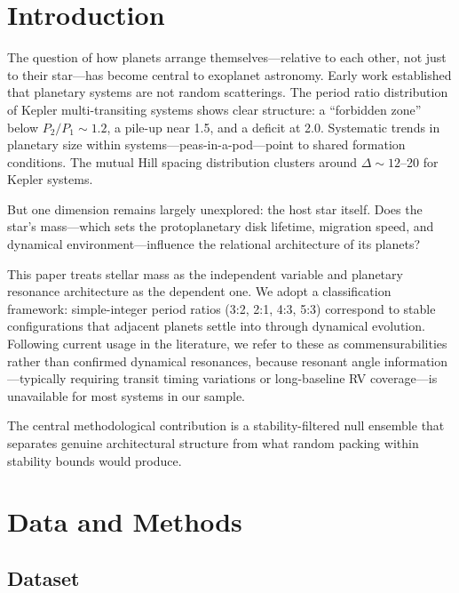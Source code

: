 \documentclass[twocolumn,usenatbib]{mnras}
\begin{document}
\section{Introduction}
\label{sec:intro}

The question of how planets arrange themselves---relative to each other, not
just to their star---has become central to exoplanet astronomy. Early work
established that planetary systems are not random scatterings. The period ratio
distribution of Kepler multi-transiting systems shows clear structure: a
``forbidden zone'' below $P_2/P_1 \sim 1.2$, a pile-up near 1.5, and a deficit
at 2.0\citep{fabrycky2014,fang_margot_2012}. Systematic trends in planetary
size within systems---peas-in-a-pod---point to shared formation
conditions\citep{weiss2018,millholland2021}. The mutual Hill spacing
distribution clusters around $\Delta \sim 12$--20 for Kepler
systems\citep{puwu2015,fang_margot_2013}.

But one dimension remains largely unexplored: the host star itself. Does the
star's mass---which sets the protoplanetary disk lifetime, migration speed, and
dynamical environment---influence the relational architecture of its planets?

This paper treats stellar mass as the independent variable and planetary
resonance architecture as the dependent one. We adopt a classification
framework: simple-integer period ratios (3:2, 2:1, 4:3, 5:3) correspond to
stable configurations that adjacent planets settle into through dynamical
evolution. Following current usage in the literature\citep{mills2016,luger2017},
we refer to these as commensurabilities rather than confirmed dynamical
resonances, because resonant angle information---typically requiring transit
timing variations or long-baseline RV coverage---is unavailable for most systems
in our sample.

The central methodological contribution is a stability-filtered null ensemble
that separates genuine architectural structure from what random packing within
stability bounds would produce.

\section{Data and Methods}
\label{sec:methods}

\subsection{Dataset}
\end{document}
